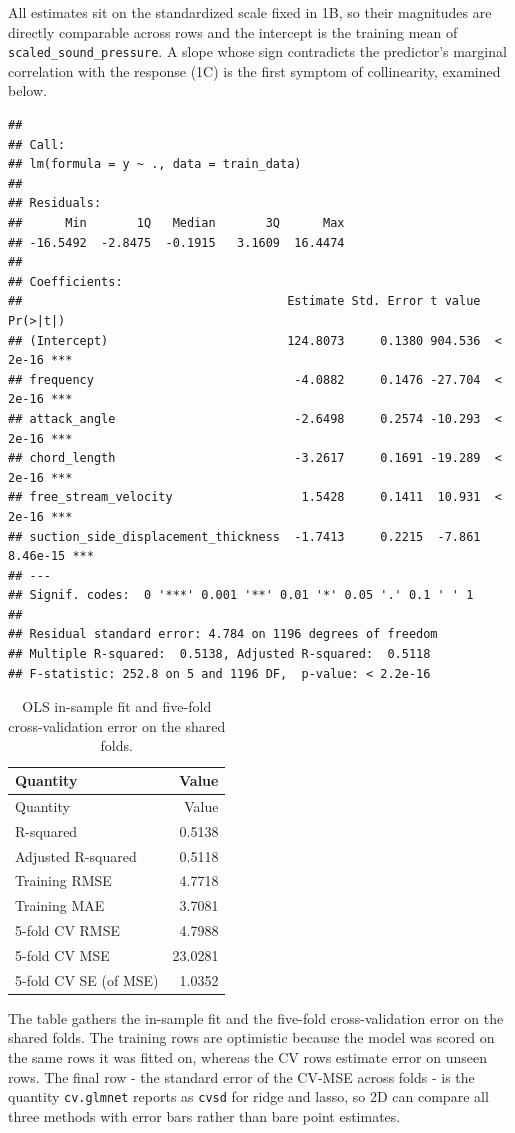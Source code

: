 \documentclass[
  11pt,
]{article}
\begin{document}
All estimates sit on the standardized scale fixed in 1B, so their
magnitudes are directly comparable across rows and the intercept is the
training mean of \texttt{scaled\_sound\_pressure}. A slope whose sign
contradicts the predictor's marginal correlation with the response (1C)
is the first symptom of collinearity, examined below.

\begin{verbatim}
## 
## Call:
## lm(formula = y ~ ., data = train_data)
## 
## Residuals:
##      Min       1Q   Median       3Q      Max 
## -16.5492  -2.8475  -0.1915   3.1609  16.4474 
## 
## Coefficients:
##                                     Estimate Std. Error t value Pr(>|t|)    
## (Intercept)                         124.8073     0.1380 904.536  < 2e-16 ***
## frequency                            -4.0882     0.1476 -27.704  < 2e-16 ***
## attack_angle                         -2.6498     0.2574 -10.293  < 2e-16 ***
## chord_length                         -3.2617     0.1691 -19.289  < 2e-16 ***
## free_stream_velocity                  1.5428     0.1411  10.931  < 2e-16 ***
## suction_side_displacement_thickness  -1.7413     0.2215  -7.861 8.46e-15 ***
## ---
## Signif. codes:  0 '***' 0.001 '**' 0.01 '*' 0.05 '.' 0.1 ' ' 1
## 
## Residual standard error: 4.784 on 1196 degrees of freedom
## Multiple R-squared:  0.5138, Adjusted R-squared:  0.5118 
## F-statistic: 252.8 on 5 and 1196 DF,  p-value: < 2.2e-16
\end{verbatim}

\begin{longtable}[]{@{}lr@{}}
\caption{OLS in-sample fit and five-fold cross-validation error on the
shared folds.}\tabularnewline
\toprule\noalign{}
Quantity & Value \\
\midrule\noalign{}
\endfirsthead
\toprule\noalign{}
Quantity & Value \\
\midrule\noalign{}
\endhead
\bottomrule\noalign{}
\endlastfoot
R-squared & 0.5138 \\
Adjusted R-squared & 0.5118 \\
Training RMSE & 4.7718 \\
Training MAE & 3.7081 \\
5-fold CV RMSE & 4.7988 \\
5-fold CV MSE & 23.0281 \\
5-fold CV SE (of MSE) & 1.0352 \\
\end{longtable}

The table gathers the in-sample fit and the five-fold cross-validation
error on the shared folds. The training rows are optimistic because the
model was scored on the same rows it was fitted on, whereas the CV rows
estimate error on unseen rows. The final row - the standard error of the
CV-MSE across folds - is the quantity \texttt{cv.glmnet} reports as
\texttt{cvsd} for ridge and lasso, so 2D can compare all three methods
with error bars rather than bare point estimates.
\end{document}
